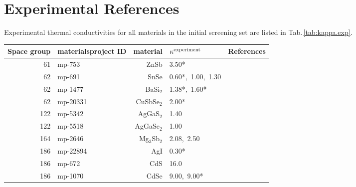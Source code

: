 \chapter{Experimental References}
\label{sec:app.experiments}

Experimental thermal conductivities for all materials in the initial screening set are listed in Tab.\,\ref{tab:kappa.exp}.

\begin{table*}[ht]
\small
\begin{center}
\begin{tabular}{rlrll}
\toprule
      Space group &       materialsproject ID &      material &       $\kappa^{\rm experiment}$ & References \\
\midrule
      61 &      mp-753 &          ZnSb &            3.50* &       \cite{Bjerg.2014} \\
      62 &      mp-691 &          SnSe &            0.60*,~1.00,~1.30 &        \cite{Zhao.2014,Sassi.2014,Wei.2016} \\
      62 &     mp-1477 &      BaSi$_2$ &            1.38*,~1.60* &   \cite{Hashimoto.2007,Spitzer.1970} \\
      62 &    mp-20331 &    CuSbSe$_2$ &            2.00* &          \cite{Li.2006} \\
     122 &     mp-5342 &     AgGaS$_2$ &            1.40 &     \cite{Beasley.1994} \\
     122 &     mp-5518 &    AgGaSe$_2$ &            1.00 &     \cite{Beasley.1994} \\
     164 &     mp-2646 &  Mg$_3$Sb$_2$ &            2.08,~2.50 &   \cite{Ahmadpour.2007,Pan.2020} \\
     186 &    mp-22894 &           AgI &            0.30* &       \cite{Goetz.1982} \\
     186 &      mp-672 &           CdS &           16.0 &     \cite{Morelli.2006} \\
     186 &     mp-1070 &          CdSe &            9.00,~9.00* &       \cite{Feser.2013,Slack.1972} \\

\end{tabular}
\end{center}
\end{table*}
